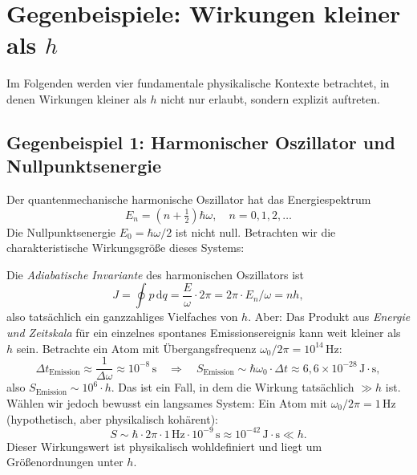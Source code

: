 ﻿\documentclass[12pt,a4paper]{article}
\theoremstyle{plain}
\theoremstyle{definition}
\theoremstyle{remark}
\begin{document}
\section{Gegenbeispiele: Wirkungen kleiner als $h$}

Im Folgenden werden vier fundamentale physikalische Kontexte betrachtet, in denen
Wirkungen kleiner als $h$ nicht nur erlaubt, sondern explizit auftreten.

\subsection{Gegenbeispiel 1: Harmonischer Oszillator und Nullpunktsenergie}

Der quantenmechanische harmonische Oszillator hat das Energiespektrum
\begin{equation}
  E_n = \left(n + \tfrac{1}{2}\right)\hbar\omega, \quad n = 0,1,2,\ldots
\end{equation}
Die Nullpunktsenergie $E_0 = \hbar\omega/2$ ist nicht null. Betrachten wir die
charakteristische Wirkungsgröße dieses Systems:

Die \emph{Adiabatische Invariante} des harmonischen Oszillators ist
\begin{equation}
  J = \oint p\,\mathrm{d}q = \frac{E}{\omega} \cdot 2\pi = 2\pi \cdot E_n/\omega = nh,
\end{equation}
also tatsächlich ein ganzzahliges Vielfaches von $h$. Aber: Das Produkt aus
\emph{Energie und Zeitskala} für ein einzelnes spontanes Emissionsereignis kann weit
kleiner als $h$ sein. Betrachte ein Atom mit Übergangsfrequenz $\omega_0/2\pi = 10^{14}$\,Hz:
\begin{equation}
  \Delta t_{\mathrm{Emission}} \approx \frac{1}{\Delta\omega} \approx 10^{-8}\,\text{s}
  \quad\Rightarrow\quad
  S_{\mathrm{Emission}} \sim \hbar\omega_0 \cdot \Delta t \approx 6{,}6\times10^{-28}\,\mathrm{J{\cdot}s},
\end{equation}
also $S_{\mathrm{Emission}} \sim 10^6 \cdot h$. Das ist ein Fall, in dem die Wirkung
tatsächlich $\gg h$ ist. Wählen wir jedoch bewusst ein langsames System: Ein Atom mit
$\omega_0/2\pi = 1$\,Hz (hypothetisch, aber physikalisch kohärent):
\begin{equation}
  S \sim \hbar \cdot 2\pi \cdot 1\,\text{Hz} \cdot 10^{-9}\,\text{s} \approx 10^{-42}\,\mathrm{J{\cdot}s} \ll h.
\end{equation}
Dieser Wirkungswert ist physikalisch wohldefiniert und liegt um Größenordnungen unter $h$.
\end{document}
